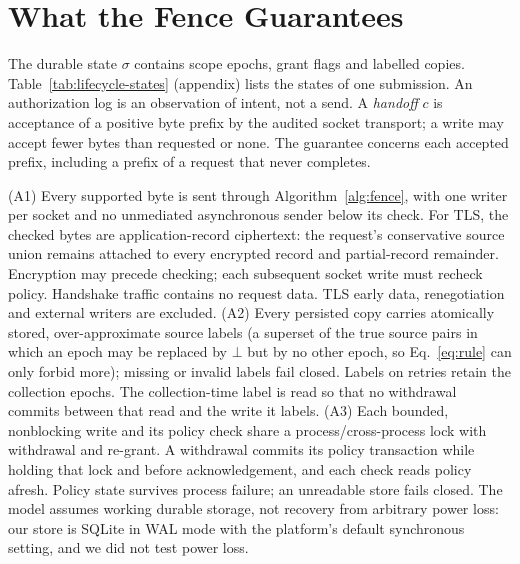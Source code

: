 \section{What the Fence Guarantees}
\label{sec:theory}

The durable state $\sigma$ contains scope epochs, grant flags and labelled copies.
Table~\ref{tab:lifecycle-states} (appendix) lists the states of one submission. An authorization
log is an observation of intent, not a send. A \emph{handoff} $c$ is acceptance of a
positive byte prefix by the audited socket transport; a write may accept fewer bytes
than requested or none. The guarantee concerns each accepted prefix, including a
prefix of a request that never completes.


\begin{assumption}\label{as:sp}
(A1) Every supported byte is sent through Algorithm~\ref{alg:fence}, with one writer
per socket and no unmediated asynchronous sender below its check. For TLS, the checked bytes are application-record ciphertext: the request's conservative source union remains attached to every encrypted record and partial-record remainder. Encryption may precede checking; each subsequent socket write must recheck policy. Handshake traffic contains no request data. TLS early data, renegotiation and external writers are excluded.
(A2) Every persisted copy carries atomically stored, over-approximate source labels (a superset of the true source
pairs in which an epoch may be replaced by $\bot$ but by no other epoch, so Eq.~\ref{eq:rule} can only forbid more);
missing or invalid labels fail closed. Labels on retries retain the collection epochs. The collection-time label
is read so that no withdrawal commits between that read and the write it labels.
(A3) Each bounded, nonblocking write and its policy check share a process/cross-process
lock with withdrawal and re-grant. A withdrawal commits its policy transaction while holding that lock and before
acknowledgement, and each check reads policy afresh. Policy state survives process failure; an unreadable store fails
closed. The model assumes working durable storage, not recovery from arbitrary power loss: our store is SQLite in WAL
mode with the platform's default synchronous setting, and we did not test power loss.
\end{assumption}

